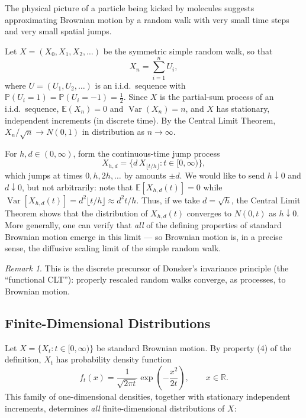 \documentclass[12pt,openany]{book}
\theoremstyle{definition}
\theoremstyle{remark}
\newtheorem{remark}[theorem]{Remark}
\newcommand{\R}{\mathbb{R}}
\newcommand{\E}{\mathbb{E}}
\newcommand{\Prob}{\mathbb{P}}
\DeclareMathOperator{\Var}{Var}
\begin{document}
The physical picture of a particle being kicked by molecules suggests approximating Brownian motion by a random walk with very small time steps and very small spatial jumps.
 
Let $X = (X_0, X_1, X_2, \dots)$ be the symmetric simple random walk, so that
\[
    X_n = \sum_{i=1}^n U_i,
\]
where $U = (U_1, U_2, \dots)$ is an i.i.d.\ sequence with $\Prob(U_i = 1) = \Prob(U_i = -1) = \tfrac12$. Since $X$ is the partial-sum process of an i.i.d.\ sequence, $\E(X_n) = 0$ and $\Var(X_n) = n$, and $X$ has stationary, independent increments (in discrete time). By the Central Limit Theorem, $X_n / \sqrt{n} \to N(0,1)$ in distribution as $n \to \infty$.
 
For $h, d \in (0,\infty)$, form the continuous-time jump process
\begin{equation}
    X_{h,d} = \{ d\, X_{\lfloor t/h \rfloor} : t \in [0,\infty)\}, \tag{18.1.1}
\end{equation}
which jumps at times $0, h, 2h, \dots$ by amounts $\pm d$. We would like to send $h \downarrow 0$ and $d \downarrow 0$, but not arbitrarily: note that $\E[X_{h,d}(t)] = 0$ while $\Var[X_{h,d}(t)] = d^2 \lfloor t/h \rfloor \approx d^2 t/h$. Thus, if we take $d = \sqrt{h}$, the Central Limit Theorem shows that the distribution of $X_{h,d}(t)$ converges to $N(0,t)$ as $h \downarrow 0$. More generally, one can verify that \emph{all} of the defining properties of standard Brownian motion emerge in this limit — so Brownian motion is, in a precise sense, the diffusive scaling limit of the simple random walk.
 
\begin{remark}
This is the discrete precursor of Donsker's invariance principle (the ``functional CLT''): properly rescaled random walks converge, as processes, to Brownian motion.
\end{remark}
 
\subsection{Finite-Dimensional Distributions}
\label{sec:fdd}
 
Let $X = \{X_t : t \in [0,\infty)\}$ be standard Brownian motion. By property (4) of the definition, $X_t$ has probability density function
\begin{equation}
    f_t(x) = \frac{1}{\sqrt{2\pi t}} \exp\!\left(-\frac{x^2}{2t}\right), \qquad x \in \R. \tag{18.1.2}
\end{equation}
This family of one-dimensional densities, together with stationary independent increments, determines \emph{all} finite-dimensional distributions of $X$:
 
\end{document}
